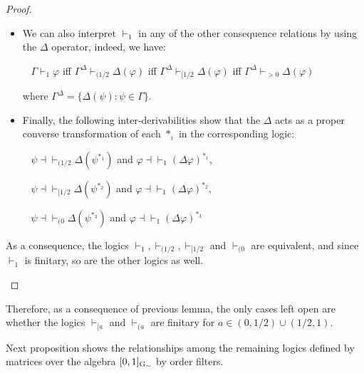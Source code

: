 \documentclass{article}
\theoremstyle{definition}
\begin{document}
\begin{proof}
\begin{itemize}
\begin{itemize}
\item[(ii)] We can also interpret $\vdash_1$ in any of the other consequence relations by using the $\Delta$ operator, indeed, we have: 

\mbox{ } $\Gamma\vdash_1\varphi$ iff $\Gamma^{\Delta}\vdash_{(1/2}\Delta(\varphi)$ iff $\Gamma^{\Delta}\vdash_{[1/2}\Delta(\varphi)$ iff $\Gamma^{\Delta}\vdash_{>0}\Delta(\varphi)$

where $\Gamma^{\Delta} = \{\Delta(\psi)  : \psi\in\Gamma\}$. 

\item[(iii)]  Finally, the following inter-derivabilities show that the $\Delta$ acts as a proper converse transformation of each $*_i$ in the corresponding logic: 

\mbox{ } $ \psi\dashv\vdash _{(1/2}\Delta(\psi^{*_1})$ and   $ \varphi\dashv\vdash_1 (\Delta \varphi)^{*_1}$,

\mbox{ } $ \psi\dashv\vdash _{[1/2}\Delta(\psi^{*_2})$ and   $ \varphi\dashv\vdash_1 (\Delta \varphi)^{*_2}$, 

\mbox{ } $ \psi\dashv\vdash _{(0}\Delta(\psi^{*_3})$ and   $ \varphi\dashv\vdash_1 (\Delta \varphi)^{*_3}$
\end{itemize}

As a consequence, the logics $\vdash_1, \vdash_{(1/2}, \vdash_{[1/2}$ and $\vdash_{(0}$ are equivalent, and since $\vdash_1$ is finitary, so are the other logics as well. 
\end{itemize}
\end{proof}
Therefore, as a consequence of previous lemma, the only cases left open are whether the logics $\vdash_{[a}$ and $\vdash_{(a}$ are finitary for $a \in (0, 1/2) \cup (1/2, 1)$.


Next proposition shows the relationships among the remaining logics defined by matrices over the algebra $[0,1]_{\rm{G}_\sim}$ by order filters.
\end{document}
